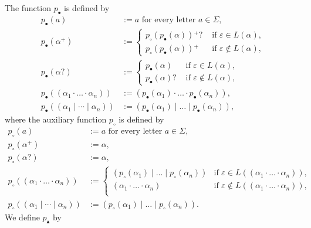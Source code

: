 \documentclass[a4paper,11pt, svgnames,titlepage]{article}
\newcommand{\rxp}{{^\mathtt{+}}}
\newcommand{\rxo}{\mathtt{?}}
\newcommand{\rxc}{\cdot}
\DeclareMathOperator{\ror}{\mathtt{|}}
\newcommand{\emptyword}{\varepsilon}
\newcommand{\df}{:=}
\newcommand{\wpnffun}{p_{\bullet}}
\newcommand{\wpnfhfun}{p_{\circ}}
\newcommand{\pnfupfun}{p_{\blacktriangle}}
\newcommand{\wpnf}[1]{\wpnffun{\left(#1\right)}}
\newcommand{\wpnfh}[1]{\wpnfhfun{\left(#1\right)}}
\begin{document}
The function $\wpnffun$ is defined by
\begin{align*}
	\wpnf{a}&\df a \text{ for every letter $a\in \Sigma$,}\\
	\wpnf{\alpha\rxp}
		&\df \begin{cases}
			\wpnfh{\wpnf{\alpha}}\rxp\rxo & \text{ if $\emptyword\in L(\alpha)$,}\\
			\wpnfh{\wpnf{\alpha}}\rxp & \text{ if $\emptyword\notin L(\alpha)$,}
		\end{cases}\\
	\wpnf{\alpha\rxo}
		&\df \begin{cases}
			\wpnf{\alpha} & \text{ if $\emptyword\in L(\alpha)$,}\\
			\wpnf{\alpha}\rxo & \text{ if $\emptyword\notin L(\alpha)$,}
		\end{cases}\\
	\wpnf{(\alpha_1\rxc \ldots \rxc \alpha_n)}
		&\df (\wpnf{\alpha_1}\rxc \ldots \rxc \wpnf{\alpha_n}),\\
	\wpnf{(\alpha_1\ror \cdots \ror \alpha_n)}
		&\df (\wpnf{\alpha_1} \ror \ldots \ror \wpnf{\alpha_n}),
\end{align*}
where the auxiliary function $\wpnfhfun$ is defined by 
\begin{align*}
	\wpnfh{a}&\df a\text{ for every letter $a\in \Sigma$,}\\
	\wpnfh{\alpha\rxp}
		&\df \alpha,\\
	\wpnfh{\alpha\rxo}
		&\df \alpha,\\
	\wpnfh{(\alpha_1\rxc \ldots \rxc \alpha_n)}
		&\df \begin{cases}
			(\wpnfh{\alpha_1}\ror \ldots \ror \wpnfh{\alpha_n}) & \text{if $\emptyword\in L((\alpha_1\rxc \ldots \rxc \alpha_n))$},\\
			(\alpha_1\rxc \ldots \rxc \alpha_n) & \text{if $\emptyword\notin L((\alpha_1\rxc \ldots \rxc \alpha_n))$},\\
		\end{cases}\\
	\wpnfh{(\alpha_1\ror \cdots \ror \alpha_n)}
		&\df (\wpnfh{\alpha_1}\ror \ldots \ror \wpnfh{\alpha_n}).
\end{align*}
We define $\pnfupfun$ by
\end{document}
